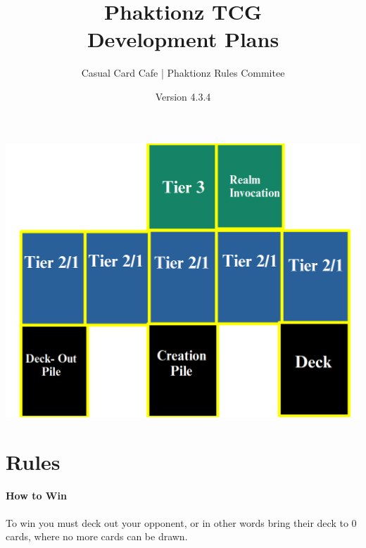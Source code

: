 \documentclass[12pt, letterpaper]{article}
\title{Phaktionz TCG \\Development Plans}
\author{Casual Card Cafe | Phaktionz Rules Commitee}
\date{Version 4.3.4}
\begin{document}
\maketitle
{}
\newpage
\tableofcontents
\newpage
\begin{center}
    \includegraphics[scale = 0.25]{images/field.png}
\end{center}


\section{Rules}
\paragraph{How to Win\\}
To win you must deck out your opponent, or in other words bring their deck to 0 cards, where no more cards can be drawn.
\end{document}
